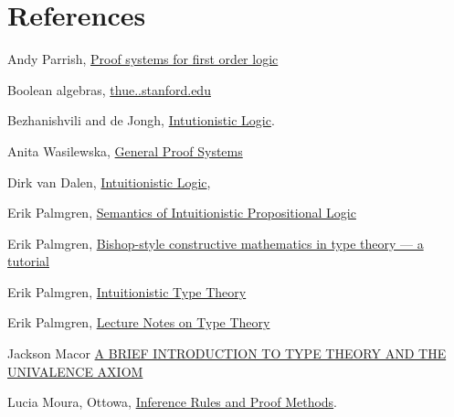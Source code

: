 

\section{References}


\begin{thebibliography}




 Andy Parrish, \href{https://www.math.ucsd.edu/~sbuss/CourseWeb/Math260_2012WS/Feb10Parrish.pdf}{Proof systems for first order logic}

 Boolean algebras, \href{http://thue.stanford.edu/bool.html}{thue..stanford.edu}

 Bezhanishvili and de Jongh,  \href{https://www.illc.uva.nl/Research/Publications/Reports/PP-2006-25.text.pdf}{Intutionistic Logic}. 

 Anita Wasilewska, \href{https://www3.cs.stonybrook.edu/~cse541/chapter7.pdf}{General Proof Systems}

 Dirk van Dalen,  \href{https://pdfs.semanticscholar.org/1e75/6d625d4cf2d91f69149b3d5a1f2d07fe4b2f.pdf}{Intuitionistic Logic}, 

 Erik Palmgren, \href{http://www2.math.uu.se/~palmgren/tillog/heyting3.pdf}{Semantics of Intuitionistic Propositional Logic}

 Erik Palmgren, \href{http://staff.math.su.se/palmgren/Palmgren_Nis.pdf}{Bishop-style constructive mathematics in type theory — a tutorial}

 Erik Palmgren, \href{http://www.cse.chalmers.se/~peterd/papers/IntuitionisticTypeTheory150505.pdf}{Intuitionistic Type Theory}

 Erik Palmgren, \href{http://staff.math.su.se/palmgren/lecturenotesTT.pdf}{Lecture Notes on Type Theory}

 Jackson Macor \href{https://math.uchicago.edu/~may/REU2015/REUPapers/Macor.pdf}{A  BRIEF  INTRODUCTION  TO  TYPE  THEORY  AND  THE
UNIVALENCE  AXIOM}

 Lucia Moura, Ottowa, \href{https://www.site.uottawa.ca/~lucia/courses/2101-10/lecturenotes/04InferenceRulesProofMethods.pdf}{Inference Rules and Proof Methods}.  


\end{thebibliography}
